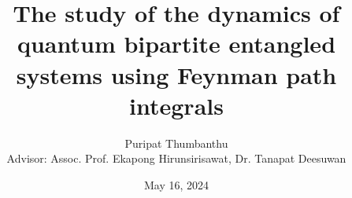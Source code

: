 \documentclass[a4paper, 11pt, openleft]{memoir}
\begin{document}
\title{The study of the dynamics of quantum bipartite entangled systems using Feynman path integrals}
\author{Puripat Thumbanthu \\ Advisor: Assoc. Prof. Ekapong Hirunsirisawat, Dr. Tanapat Deesuwan}
\date{May 16, 2024}

\maketitle

\tableofcontents*





\end{document}

